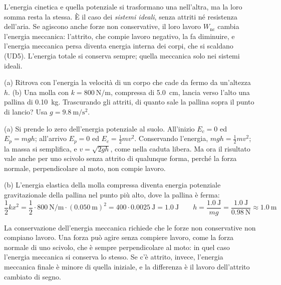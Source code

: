 L'energia cinetica e quella potenziale si trasformano una nell'altra, ma la loro somma resta la stessa. È il caso dei \emph{sistemi ideali}, senza attriti né resistenza dell'aria. Se agiscono anche forze non conservative, il loro lavoro $W_{\text{nc}}$ cambia l'energia meccanica: l'attrito, che compie lavoro negativo, la fa diminuire, e l'energia meccanica persa diventa energia interna dei corpi, che si scaldano (UD5). L'energia totale si conserva sempre; quella meccanica solo nei sistemi ideali.

\begin{esempio}
(a) Ritrova con l'energia la velocità di un corpo che cade da fermo da un'altezza $h$. (b) Una molla con $k = \SI{800}{\newton\per\metre}$, compressa di \SI{5,0}{\centi\metre}, lancia verso l'alto una pallina di \SI{0,10}{\kilo\gram}. Trascurando gli attriti, di quanto sale la pallina sopra il punto di lancio? Usa $g = \SI{9,8}{\metre\per\second\squared}$.

(a) Si prende lo zero dell'energia potenziale al suolo. All'inizio $E_c = 0$ ed $E_p = mgh$; all'arrivo $E_p = 0$ ed $E_c = \frac12 mv^2$. Conservando l'energia, $mgh = \frac12 mv^2$; la massa si semplifica, e $v = \sqrt{2gh}$, come nella caduta libera. Ma ora il risultato vale anche per uno scivolo senza attrito di qualunque forma, perché la forza normale, perpendicolare al moto, non compie lavoro.

(b) L'energia elastica della molla compressa diventa energia potenziale gravitazionale della pallina nel punto più alto, dove la pallina è ferma:
\[
  \frac12 k x^2 = \frac12 \cdot \SI{800}{\newton\per\metre} \cdot (\SI{0,050}{\metre})^2 = 400 \cdot \SI{0,0025}{\joule} = \SI{1,0}{\joule}
  \qquad
  h = \frac{\SI{1,0}{\joule}}{mg} = \frac{\SI{1,0}{\joule}}{\SI{0,98}{\newton}} \approx \SI{1,0}{\metre}
\]
\end{esempio}

\begin{attenzione}
La conservazione dell'energia meccanica richiede che le forze non conservative non compiano lavoro. Una forza può agire senza compiere lavoro, come la forza normale di uno scivolo, che è sempre perpendicolare al moto: in quel caso l'energia meccanica si conserva lo stesso. Se c'è attrito, invece, l'energia meccanica finale è minore di quella iniziale, e la differenza è il lavoro dell'attrito cambiato di segno.
\end{attenzione}

